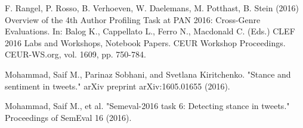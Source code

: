 \begin{thebibliography}{1}
F. Rangel, P. Rosso, B. Verhoeven, W. Daelemans, M. Potthast, B. Stein (2016) Overview of the 4th Author Profiling Task at PAN 2016: Cross-Genre Evaluations. In: Balog K., Cappellato L., Ferro N., Macdonald C. (Eds.) CLEF 2016 Labs and Workshops, Notebook Papers. CEUR Workshop Proceedings. CEUR-WS.org, vol. 1609, pp. 750-784.

Mohammad, Saif M., Parinaz Sobhani, and Svetlana Kiritchenko. "Stance and sentiment in tweets." arXiv preprint arXiv:1605.01655 (2016).

Mohammad, Saif M., et al. "Semeval-2016 task 6: Detecting stance in tweets." Proceedings of SemEval 16 (2016).

\end{thebibliography}